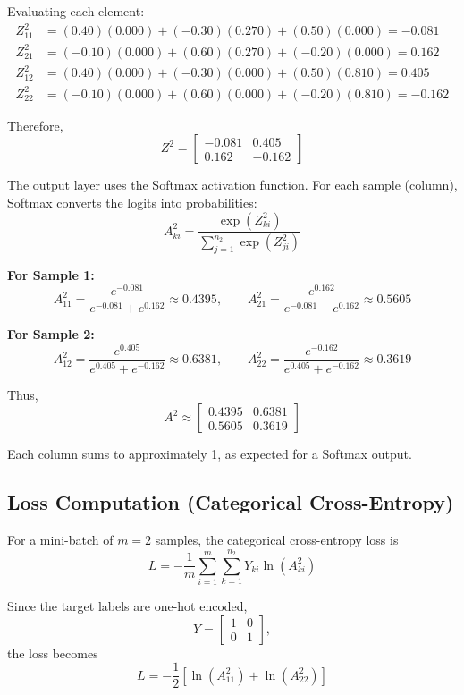 \documentclass[11pt]{article}
\begin{document}
Evaluating each element:
\begin{align*}
Z^2_{11} &= (0.40)(0.000) + (-0.30)(0.270) + (0.50)(0.000) = -0.081 \\
Z^2_{21} &= (-0.10)(0.000) + (0.60)(0.270) + (-0.20)(0.000) = 0.162 \\
Z^2_{12} &= (0.40)(0.000) + (-0.30)(0.000) + (0.50)(0.810) = 0.405 \\
Z^2_{22} &= (-0.10)(0.000) + (0.60)(0.000) + (-0.20)(0.810) = -0.162
\end{align*}

Therefore,
\[
Z^2 =
\begin{bmatrix}
-0.081 & 0.405 \\
0.162 & -0.162
\end{bmatrix}
\]

The output layer uses the Softmax activation function. For each sample (column), Softmax converts the logits into probabilities:
\[
A^2_{ki} = \frac{\exp(Z^2_{ki})}{\sum_{j=1}^{n_2} \exp(Z^2_{ji})}
\]

\textbf{For Sample 1:}
\[
A^2_{11} = \frac{e^{-0.081}}{e^{-0.081}+e^{0.162}} \approx 0.4395, \qquad
A^2_{21} = \frac{e^{0.162}}{e^{-0.081}+e^{0.162}} \approx 0.5605
\]

\textbf{For Sample 2:}
\[
A^2_{12} = \frac{e^{0.405}}{e^{0.405}+e^{-0.162}} \approx 0.6381, \qquad
A^2_{22} = \frac{e^{-0.162}}{e^{0.405}+e^{-0.162}} \approx 0.3619
\]

Thus,
\[
A^2 \approx
\begin{bmatrix}
0.4395 & 0.6381 \\
0.5605 & 0.3619
\end{bmatrix}
\]

Each column sums to approximately 1, as expected for a Softmax output.

\subsection{Loss Computation (Categorical Cross-Entropy)}

For a mini-batch of $m=2$ samples, the categorical cross-entropy loss is
\[
L = -\frac{1}{m}\sum_{i=1}^{m}\sum_{k=1}^{n_2} Y_{ki}\ln(A^2_{ki})
\]

Since the target labels are one-hot encoded,
\[
Y = \begin{bmatrix} 1 & 0 \\ 0 & 1 \end{bmatrix},
\]
the loss becomes
\[
L = -\frac{1}{2}\left[\ln(A^2_{11}) + \ln(A^2_{22})\right]
\]
\end{document}
